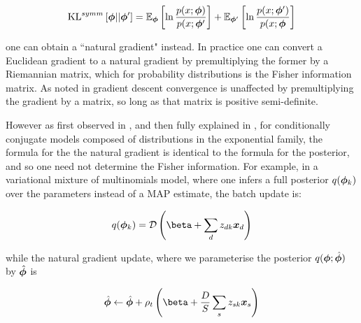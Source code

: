 \begin{align*}
\symmkl{\param}{\param'}
 = \ex{\ln \frac{p(x; \param)}{p(x; \param'}}{\param}
 + \ex{\ln \frac{p(x; \param')}{p(x; \param}}{\param'}
\end{align*}

one can obtain a ``natural gradient" instead. In practice one can convert a Euclidean gradient to a natural gradient by premultiplying the former by a Riemannian matrix, which for probability distributions is the Fisher information matrix. As noted in \cite{Bottou2004} gradient descent convergence is unaffected by premultiplying the gradient by a matrix, so long as that matrix is positive semi-definite.

However as first observed in \cite{Hoffman2010}, and then fully explained in \cite{Hoffman2012}, for conditionally conjugate models composed of distributions in the exponential family, the formula for the the natural gradient is identical to the formula for the posterior, and so one need not determine the Fisher information. For example, in a variational mixture of multinomials model, where one infers a full posterior $q(\param_k)$ over the parameters instead of a MAP estimate, the batch update is:

\begin{align*}
q(\param_k) = \dir{\vv{\beta} + \sum_d z_{dk} \vv{x}_{d}}
\end{align*}

while the natural gradient update, where we parameterise the posterior $q(\param; \hat{\param})$ by $\hat{\param}$ is 

\begin{align}
\hat{\param} \leftarrow \hat{\param} + \rho_t \left(\vv{\beta} + \frac{D}{S} \sum_s z_{sk} \vv{x}_s\right)
\end{align}



